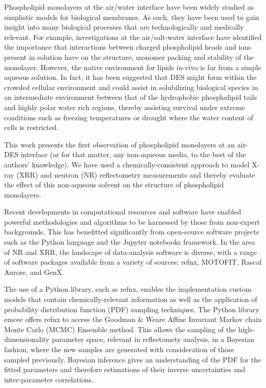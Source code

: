 \documentclass[twocolumn,a4paper]{paper}
\begin{document}
Phospholipid monolayers at the air/water interface have been widely studied as simplistic models for biological membranes.
As such, they have been used to gain insight into many biological processes that are technologically and medically relevant.
For example, investigations at the air/salt-water interface have identified the importance that interactions between charged phospholipid heads and ions present in solution have on the structure, monomer packing and stability of the monolayer\cite{Mohwald1990,Kewalramani2010}.
However, the native environment for lipids in-vivo is far from a simple aqueous solution.
In fact, it has been suggested\cite{Dai2013,Hammond2017} that DES might form within the crowded cellular environment and could assist in solubilizing biological species in an intermediate environment between that of the hydrophobic phospholipid tails and highly polar water rich regions, thereby assisting survival under extreme conditions such as freezing temperatures or drought where the water content of cells is restricted.

This work presents the first observation of phospholipid monolayers at an air-DES interface (or for that matter, any non-aqueous media, to the best of the authors' knowledge).
We have used a chemically-consistent approach to model X-ray (XRR) and neutron (NR) reflectometry measurements and thereby evaluate the effect of this non-aqueous solvent on the structure of phospholipid monolayers.

Recent developments in computational resources and software have enabled powerful methodologies and algorithms to be harnessed by those from non-expert backgrounds.
This has benefitted significantly from open-source software projects such as the Python language\cite{vanRossum1995} and the Jupyter notebooks framework\cite{Kluyver2016}.
In the area of NR and XRR, the landscape of data-analysis software is diverse, with a range of software packages available from a variety of sources; refnx\cite{Nelson2018}, MOTOFIT\cite{Nelson2006}, Rascal\cite{HughesRascal} Aurore\cite{Gerelli2016}, and GenX\cite{Bjorck2007}.

The use of a Python library, such as refnx, enables the implementation custom models that contain chemically-relevant information as well as the application of probability distribution function (PDF) sampling techniques.
The Python library emcee\cite{Foreman-Mackey2013} offers refnx to access the Goodman \& Weare Affine Invariant Markov chain Monte Carlo (MCMC) Ensemble method\cite{Goodman2010}.
This allows the sampling of the high-dimensionality parameter space, relevant in reflectomety analysis, in a Bayesian fashion, where the new samples are generated with consideration of those sampled previously\cite{Sivia2006}.
Bayesian inference gives an understanding of the PDF for the fitted parameters and therefore estimations of their inverse uncertainties and inter-parameter correlations.
\end{document}
